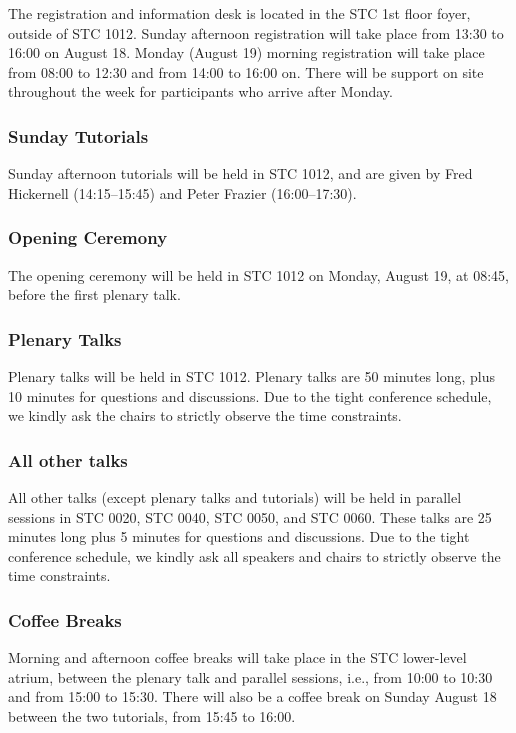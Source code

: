 The registration and information desk is located in the STC 1st floor foyer, outside of STC 1012.
Sunday afternoon registration will take place from 13:30 to 16:00 on August 18. Monday (August 19) morning registration will take place from
08:00 to 12:30 and from 14:00 to 16:00 on. There will be support on site throughout the week for participants who arrive after Monday. 


\subsubsection{Sunday Tutorials}

Sunday afternoon tutorials will be held in STC 1012, and are given by 
Fred Hickernell (14:15--15:45) and Peter Frazier (16:00--17:30). 


\subsubsection{Opening Ceremony}

The opening ceremony will be held in STC 1012 on Monday, August 19,
at 08:45, before the first plenary talk.

\subsubsection{Plenary Talks}

Plenary talks will be held in STC 1012. Plenary talks are 50 minutes long, plus 10 minutes for questions and discussions. Due to the
tight conference schedule, we kindly ask the chairs to strictly
observe the time constraints.

\subsubsection{All other talks}

All other talks (except plenary talks and tutorials) will be held in 
parallel sessions in STC 0020, STC 0040, STC 0050, and STC 0060. These talks 
are 25 minutes long plus 5 minutes
for questions and discussions. Due to the tight
conference schedule, we kindly ask all speakers and chairs to strictly observe
the time constraints.


\subsubsection{Coffee Breaks}

Morning and afternoon coffee breaks will take place in the STC lower-level atrium, between the plenary talk and parallel sessions, i.e., from 10:00 to 10:30 and from 15:00 to 15:30. There will also be a coffee break on Sunday August 18 between the two tutorials, from 15:45 to 16:00.


